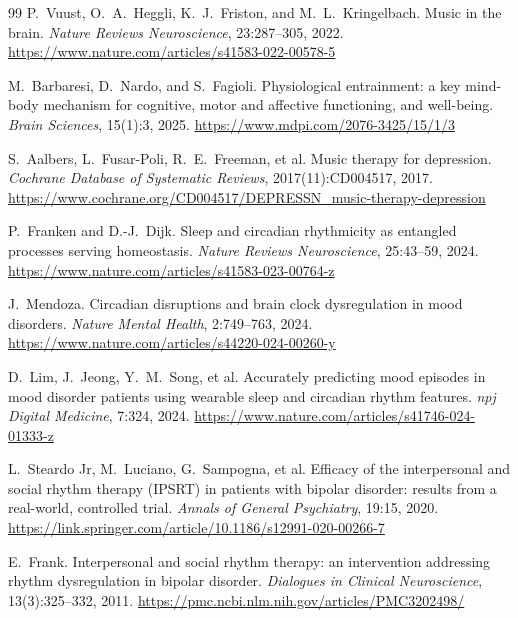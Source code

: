 \documentclass[11pt]{article}
\theoremstyle{remark}
\theoremstyle{plain}
\begin{document}
\begin{thebibliography}{99}
P.\ Vuust, O.\ A.\ Heggli, K.\ J.\ Friston, and M.\ L.\ Kringelbach.
\newblock Music in the brain.
\newblock \emph{Nature Reviews Neuroscience}, 23:287--305, 2022.
\newblock \url{https://www.nature.com/articles/s41583-022-00578-5}

M.\ Barbaresi, D.\ Nardo, and S.\ Fagioli.
\newblock Physiological entrainment: a key mind-body mechanism for cognitive, motor and affective functioning, and well-being.
\newblock \emph{Brain Sciences}, 15(1):3, 2025.
\newblock \url{https://www.mdpi.com/2076-3425/15/1/3}

S.\ Aalbers, L.\ Fusar-Poli, R.\ E.\ Freeman, et al.
\newblock Music therapy for depression.
\newblock \emph{Cochrane Database of Systematic Reviews}, 2017(11):CD004517, 2017.
\newblock \url{https://www.cochrane.org/CD004517/DEPRESSN_music-therapy-depression}

P.\ Franken and D.-J.\ Dijk.
\newblock Sleep and circadian rhythmicity as entangled processes serving homeostasis.
\newblock \emph{Nature Reviews Neuroscience}, 25:43--59, 2024.
\newblock \url{https://www.nature.com/articles/s41583-023-00764-z}

J.\ Mendoza.
\newblock Circadian disruptions and brain clock dysregulation in mood disorders.
\newblock \emph{Nature Mental Health}, 2:749--763, 2024.
\newblock \url{https://www.nature.com/articles/s44220-024-00260-y}

D.\ Lim, J.\ Jeong, Y.\ M.\ Song, et al.
\newblock Accurately predicting mood episodes in mood disorder patients using wearable sleep and circadian rhythm features.
\newblock \emph{npj Digital Medicine}, 7:324, 2024.
\newblock \url{https://www.nature.com/articles/s41746-024-01333-z}

L.\ Steardo Jr, M.\ Luciano, G.\ Sampogna, et al.
\newblock Efficacy of the interpersonal and social rhythm therapy (IPSRT) in patients with bipolar disorder: results from a real-world, controlled trial.
\newblock \emph{Annals of General Psychiatry}, 19:15, 2020.
\newblock \url{https://link.springer.com/article/10.1186/s12991-020-00266-7}

E.\ Frank.
\newblock Interpersonal and social rhythm therapy: an intervention addressing rhythm dysregulation in bipolar disorder.
\newblock \emph{Dialogues in Clinical Neuroscience}, 13(3):325--332, 2011.
\newblock \url{https://pmc.ncbi.nlm.nih.gov/articles/PMC3202498/}


\end{thebibliography}
\end{document}
